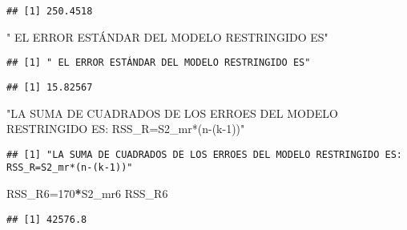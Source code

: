 \documentclass[
]{article}
\newenvironment{Shaded}{\begin{snugshade}}{\end{snugshade}}
\newcommand{\DecValTok}[1]{\textcolor[rgb]{0.00,0.00,0.81}{#1}}
\newcommand{\FloatTok}[1]{\textcolor[rgb]{0.00,0.00,0.81}{#1}}
\newcommand{\NormalTok}[1]{#1}
\newcommand{\OperatorTok}[1]{\textcolor[rgb]{0.81,0.36,0.00}{\textbf{#1}}}
\newcommand{\StringTok}[1]{\textcolor[rgb]{0.31,0.60,0.02}{#1}}
\begin{document}
\begin{Shaded}
\end{Shaded}

\begin{verbatim}
## [1] 250.4518
\end{verbatim}

\begin{Shaded}
\begin{Highlighting}[]
\StringTok{" EL ERROR ESTÁNDAR DEL MODELO RESTRINGIDO ES"}
\end{Highlighting}
\end{Shaded}

\begin{verbatim}
## [1] " EL ERROR ESTÁNDAR DEL MODELO RESTRINGIDO ES"
\end{verbatim}

\begin{Shaded}
\end{Shaded}

\begin{verbatim}
## [1] 15.82567
\end{verbatim}

\begin{Shaded}
\begin{Highlighting}[]
\StringTok{"LA SUMA DE CUADRADOS DE LOS ERROES DEL MODELO RESTRINGIDO ES: RSS_R=S2_mr*(n-(k-1))"}
\end{Highlighting}
\end{Shaded}

\begin{verbatim}
## [1] "LA SUMA DE CUADRADOS DE LOS ERROES DEL MODELO RESTRINGIDO ES: RSS_R=S2_mr*(n-(k-1))"
\end{verbatim}

\begin{Shaded}
\begin{Highlighting}[]
\NormalTok{RSS_R6=}\DecValTok{170}\OperatorTok{*}\NormalTok{S2_mr6}
\NormalTok{RSS_R6}
\end{Highlighting}
\end{Shaded}

\begin{verbatim}
## [1] 42576.8
\end{verbatim}
\end{document}
